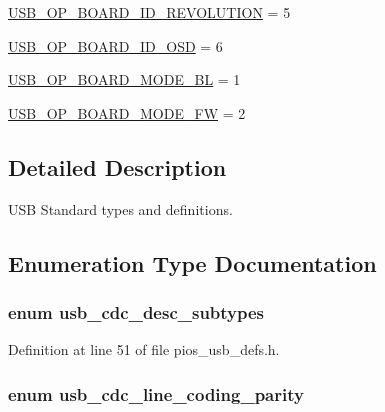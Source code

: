 \begin{DoxyCompactItemize}
\item 
\hyperlink{group___p_i_o_s___u_s_b___d_e_f_s_ga126420e50e08d0c3b6233ecf663a9d51}{U\-S\-B\-\_\-\-O\-P\-\_\-\-B\-O\-A\-R\-D\-\_\-\-I\-D\-\_\-\-R\-E\-V\-O\-L\-U\-T\-I\-O\-N} = 5
\item 
\hyperlink{group___p_i_o_s___u_s_b___d_e_f_s_gae420a56f75b7fa936432aa62cbd01394}{U\-S\-B\-\_\-\-O\-P\-\_\-\-B\-O\-A\-R\-D\-\_\-\-I\-D\-\_\-\-O\-S\-D} = 6
\item 
\hyperlink{group___p_i_o_s___u_s_b___d_e_f_s_ga767b27480b13ddffa436173c56187ee8}{U\-S\-B\-\_\-\-O\-P\-\_\-\-B\-O\-A\-R\-D\-\_\-\-M\-O\-D\-E\-\_\-\-B\-L} = 1
\item 
\hyperlink{group___p_i_o_s___u_s_b___d_e_f_s_ga49052e38fe7f9608cde64c04bf6fbd9a}{U\-S\-B\-\_\-\-O\-P\-\_\-\-B\-O\-A\-R\-D\-\_\-\-M\-O\-D\-E\-\_\-\-F\-W} = 2
\end{DoxyCompactItemize}


\subsection{Detailed Description}
U\-S\-B Standard types and definitions. 

\subsection{Enumeration Type Documentation}
\hypertarget{group___p_i_o_s___u_s_b___d_e_f_s_gadb2dd8c2f3bfb704ccb6629b322f8703}{
\subsubsection[{usb\-\_\-cdc\-\_\-desc\-\_\-subtypes}]{\setlength{\rightskip}{0pt plus 5cm}enum {\bf usb\-\_\-cdc\-\_\-desc\-\_\-subtypes}}}\label{group___p_i_o_s___u_s_b___d_e_f_s_gadb2dd8c2f3bfb704ccb6629b322f8703}


Definition at line 51 of file pios\-\_\-usb\-\_\-defs.\-h.

\hypertarget{group___p_i_o_s___u_s_b___d_e_f_s_gabc1f843b2823e8539facdbfeb734a5ad}{
\subsubsection[{usb\-\_\-cdc\-\_\-line\-\_\-coding\-\_\-parity}]{\setlength{\rightskip}{0pt plus 5cm}enum {\bf usb\-\_\-cdc\-\_\-line\-\_\-coding\-\_\-parity}}}\label{group___p_i_o_s___u_s_b___d_e_f_s_gabc1f843b2823e8539facdbfeb734a5ad}


